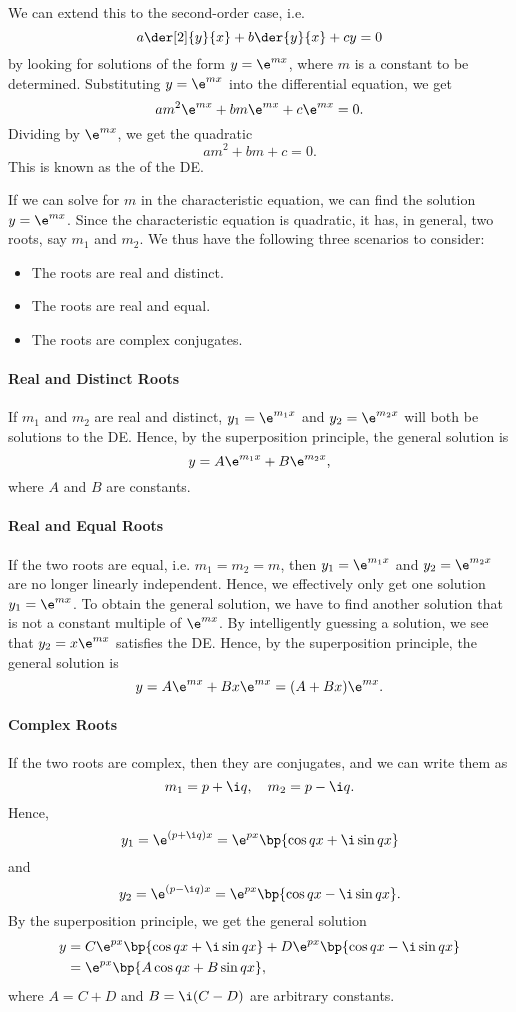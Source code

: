 We can extend this to the second-order case, i.e. \[a \der[2]{y}{x} + b \der{y}{x} + cy = 0\] by looking for solutions of the form $y= \e^{mx}$, where $m$ is a constant to be determined. Substituting $y = \e^{mx}$ into the differential equation, we get \[am^2 \e^{mx} + bm \e^{mx} + c\e^{mx} = 0.\] Dividing by $\e^{mx}$, we get the quadratic \[am^2 + bm + c = 0.\] This is known as the  of the DE.

If we can solve for $m$ in the characteristic equation, we can find the solution $y = \e^{mx}$. Since the characteristic equation is quadratic, it has, in general, two roots, say $m_1$ and $m_2$. We thus have the following three scenarios to consider:
\begin{itemize}
    \item The roots are real and distinct.
    \item The roots are real and equal.
    \item The roots are complex conjugates.
\end{itemize}

\paragraph{Real and Distinct Roots} If $m_1$ and $m_2$ are real and distinct, $y_1 = \e^{m_1 x}$ and $y_2 = \e^{m_2 x}$ will both be solutions to the DE. Hence, by the superposition principle, the general solution is \[y = A \e^{m_1 x} + B \e^{m_2 x},\] where $A$ and $B$ are constants.

\paragraph{Real and Equal Roots} If the two roots are equal, i.e. $m_1 = m_2 = m$, then $y_1 = \e^{m_1 x}$ and $y_2 = \e^{m_2 x}$ are no longer linearly independent. Hence, we effectively only get one solution $y_1 = \e^{mx}$. To obtain the general solution, we have to find another solution that is not a constant multiple of $\e^{mx}$. By intelligently guessing a solution, we see that $y_2 = x \e^{mx}$ satisfies the DE. Hence, by the superposition principle, the general solution is \[y = A \e^{mx} + Bx \e^{mx} = (A + Bx) \e^{mx}.\]

\paragraph{Complex Roots} If the two roots are complex, then they are conjugates, and we can write them as \[m_1 = p + \i q, \quad m_2 = p - \i q.\] Hence, \[y_1 = \e^{(p + \i q)x} = \e^{px} \bp{\cos qx + \i \sin qx}\] and \[y_2 = \e^{(p -\i q) x} = \e^{px} \bp{\cos qx - \i \sin qx}.\] By the superposition principle, we get the general solution
\begin{align*}
    y &= C\e^{px} \bp{\cos qx + \i \sin qx} + D\e^{px} \bp{\cos qx - \i \sin qx}\\
    &= \e^{px} \bp{A \cos qx + B \sin qx},
\end{align*}
where $A = C + D$ and $B = \i (C - D)$ are arbitrary constants.

